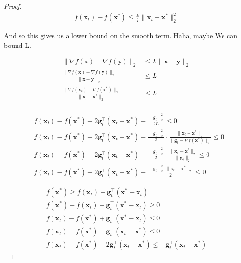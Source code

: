 \documentclass{article}
\begin{document}
\begin{proof}
	\begin{align}
		f(\mathbf{x}_t) -  f(\mathbf{x}^*) \le \frac{L}{2}\|\mathbf{x}_t-\mathbf{x}^*\|^2_2
	\end{align}
	
	And so this gives us a lower bound on the smooth term. Haha, maybe We can bound L. 

	\begin{align}
		\|\nabla f(\mathbf{x}) - \nabla f(\mathbf{y}) \|_2 &\le L\|\mathbf{x} - \mathbf{y}\|_2 \\
		\frac{\|\nabla f(\mathbf{x}) - \nabla f(\mathbf{y}) \|_2}{\|\mathbf{x} - \mathbf{y}\|_2} &\le L \\
		\frac{\|\nabla f(\mathbf{x}_t) - \nabla f(\mathbf{x}^*) \|_2}{\|\mathbf{x}_t - \mathbf{x}^*\|_2} &\le L \\
	\end{align}
	
	\begin{align}
		&f(\mathbf{x}_t) - f(\mathbf{x}^*)  - 2 \mathbf{g}^\top_t(\mathbf{x}_t - \mathbf{x}^*) +\frac{\|\mathbf{g}_t\|^2_2}{2L} \le 0\\
		&f(\mathbf{x}_t) - f(\mathbf{x}^*)  - 2 \mathbf{g}^\top_t(\mathbf{x}_t - \mathbf{x}^*) +\frac{\|\mathbf{g}_t\|^2_2}{2}\cdot \frac{\|\mathbf{x}_t - \mathbf{x}^*\|_2}{\|\mathbf{g}_t - \nabla f(\mathbf{x}^*) \|_2} \le 0\\
		&f(\mathbf{x}_t) - f(\mathbf{x}^*)  - 2 \mathbf{g}^\top_t(\mathbf{x}_t - \mathbf{x}^*) +\frac{\|\mathbf{g}_t\|^2_2}{2}\cdot \frac{\|\mathbf{x}_t - \mathbf{x}^*\|_2}{\|\mathbf{g}_t \|_2} \le 0\\
		&f(\mathbf{x}_t) - f(\mathbf{x}^*)  - 2 \mathbf{g}^\top_t(\mathbf{x}_t - \mathbf{x}^*) +\frac{\|\mathbf{g}_t\|^2_2\cdot \|\mathbf{x}_t - \mathbf{x}^*\|_2}{2}\le 0
	\end{align}
	
	\begin{align}
		f(\mathbf{x}^*) \ge f(\mathbf{x}_t) + \mathbf{g}_t^\top(\mathbf{x}^*-\mathbf{x}_t)\\
		f(\mathbf{x}^*) -  f(\mathbf{x}_t) - \mathbf{g}_t^\top(\mathbf{x}^*-\mathbf{x}_t) \ge 0 \\
		f(\mathbf{x}_t) - f(\mathbf{x}^*) + \mathbf{g}_t^\top(\mathbf{x}^*-\mathbf{x}_t) \le 0 \\
		f(\mathbf{x}_t) - f(\mathbf{x}^*) - \mathbf{g}_t^\top(\mathbf{x}_t - \mathbf{x}^*) \le 0 \\
		f(\mathbf{x}_t) - f(\mathbf{x}^*) -2 \mathbf{g}_t^\top(\mathbf{x}_t - \mathbf{x}^*) \le - \mathbf{g}_t^\top(\mathbf{x}_t - \mathbf{x}^*)
	\end{align}


\end{proof}
\end{document}

